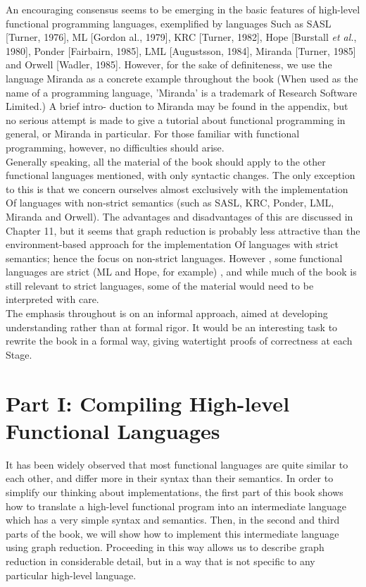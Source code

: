 \documentclass[11pt,a4paper]{book}
\begin{document}
An encouraging consensus seems to be emerging in the basic features of 
high-level functional programming languages, exemplified by languages Such 
as SASL [Turner, 1976], ML [Gordon al., 1979], KRC [Turner, 1982], 
Hope [Burstall \textit{et al.}, 1980], Ponder [Fairbairn, 1985], LML [Augustsson, 
1984], Miranda [Turner, 1985] and Orwell [Wadler, 1985]. However, for the 
sake of definiteness, we use the language Miranda as a concrete example 
throughout the book (When used as the name of a programming language, 
'Miranda' is a trademark of Research Software Limited.) A brief intro- 
duction to Miranda may be found in the appendix, but no serious attempt is 
made to give a tutorial about functional programming in general, or Miranda 
in particular. For those familiar with functional programming, however, no 
difficulties should arise.\\

Generally speaking, all the material of the book should apply to the other 
functional languages mentioned, with only syntactic changes. The only 
exception to this is that we concern ourselves almost exclusively with the 
implementation Of languages with non-strict semantics (such as SASL, KRC, 
Ponder, LML, Miranda and Orwell). The advantages and disadvantages of 
this are discussed in Chapter 11, but it seems that graph reduction is probably 
less attractive than the environment-based approach for the implementation 
Of languages with strict semantics; hence the focus on non-strict languages. 
However , some functional languages are strict (ML and Hope, for example) , 
and while much of the book is still relevant to strict languages, some of the 
material would need to be interpreted with care.\\
 
The emphasis throughout is on an informal approach, aimed at developing 
understanding rather than at formal rigor. It would be an interesting task to 
rewrite the book in a formal way, giving watertight proofs of correctness at 
each Stage.

\section{Part I: Compiling High-level Functional Languages}
It has been widely observed that most functional languages are quite similar to 
each other, and differ more in their syntax than their semantics. In order to 
simplify our thinking about implementations, the first part of this book shows 
how to translate a high-level functional program into an intermediate language 
which has a very simple syntax and semantics. Then, in the second and third 
parts of the book, we will show how to implement this intermediate language 
using graph reduction. Proceeding in this way allows us to describe graph 
reduction in considerable detail, but in a way that is not specific to any 
particular high-level language.\\
\end{document}
